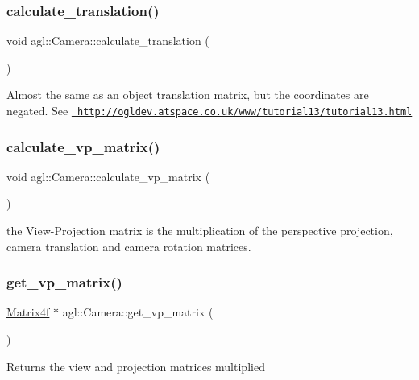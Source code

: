 \subsubsection{\texorpdfstring{calculate\_translation()}{calculate\_translation()}}
{\footnotesize\ttfamily void agl\+::\+Camera\+::calculate\+\_\+translation (\begin{DoxyParamCaption}{ }\end{DoxyParamCaption})\hspace{0.3cm}{\ttfamily [private]}}

Almost the same as an object translation matrix, but the coordinates are negated. See \href{http://ogldev.atspace.co.uk/www/tutorial13/tutorial13.html}{\texttt{ http\+://ogldev.\+atspace.\+co.\+uk/www/tutorial13/tutorial13.\+html}} \mbox{\label{classagl_1_1Camera_abfff009a6419e7f5e203b3081f840dfc}} 
\subsubsection{\texorpdfstring{calculate\_vp\_matrix()}{calculate\_vp\_matrix()}}
{\footnotesize\ttfamily void agl\+::\+Camera\+::calculate\+\_\+vp\+\_\+matrix (\begin{DoxyParamCaption}{ }\end{DoxyParamCaption})\hspace{0.3cm}{\ttfamily [private]}}

the View-\/\+Projection matrix is the multiplication of the perspective projection, camera translation and camera rotation matrices. \mbox{\label{classagl_1_1Camera_aabf49dbe9c14189dad0a2f55a0c404cb}} 
\subsubsection{\texorpdfstring{get\_vp\_matrix()}{get\_vp\_matrix()}}
{\footnotesize\ttfamily \mbox{\hyperlink{classagl_1_1Matrix4f}{Matrix4f}} $\ast$ agl\+::\+Camera\+::get\+\_\+vp\+\_\+matrix (\begin{DoxyParamCaption}{ }\end{DoxyParamCaption})}

Returns the view and projection matrices multiplied \mbox{\label{classagl_1_1Camera_a121e091d9a0f2bbb56080e0cd6774572}} 
